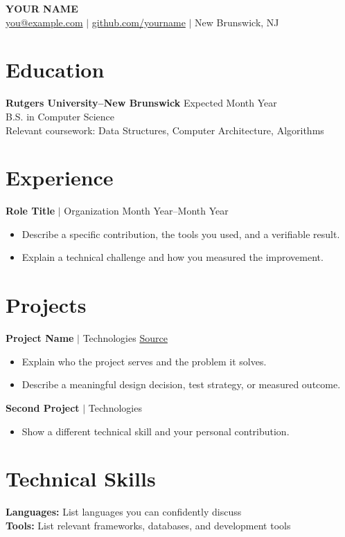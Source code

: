 \documentclass[11pt,letterpaper]{article}
\begin{document}
{\LARGE\bfseries YOUR NAME}\\[5pt]
\href{mailto:you@example.com}{you@example.com} $\vert$ \href{https://github.com/yourname}{github.com/yourname} $\vert$ New Brunswick, NJ
\section{Education}
\textbf{Rutgers University--New Brunswick} \hfill Expected Month Year\\
B.S. in Computer Science\\
Relevant coursework: Data Structures, Computer Architecture, Algorithms
\section{Experience}
\textbf{Role Title} $\vert$ Organization \hfill Month Year--Month Year
\begin{itemize}
\item Describe a specific contribution, the tools you used, and a verifiable result.
\item Explain a technical challenge and how you measured the improvement.
\end{itemize}
\section{Projects}
\textbf{Project Name} $\vert$ Technologies \hfill \href{https://github.com/yourname/project}{Source}
\begin{itemize}
\item Explain who the project serves and the problem it solves.
\item Describe a meaningful design decision, test strategy, or measured outcome.
\end{itemize}
\textbf{Second Project} $\vert$ Technologies
\begin{itemize}
\item Show a different technical skill and your personal contribution.
\end{itemize}

\section{Technical Skills}
\textbf{Languages:} List languages you can confidently discuss\\
\textbf{Tools:} List relevant frameworks, databases, and development tools
\end{document}
